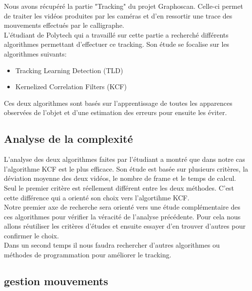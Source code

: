 \documentclass[12pt, letterpaper, twoside]{article}
\begin{document}
  

Nous avons r\'ecup\'er\'e la partie "Tracking" du projet Graphoscan. Celle-ci permet de traiter les vid\'eos produites par les cam\'eras et d'en ressortir une trace des mouvements effectu\'es par le calligraphe. \\

L'\'etudiant de Polytech qui a travaill\'e sur cette partie a recherch\'e diff\'erents algorithmes permettant d'effectuer ce tracking. Son \'etude se focalise sur les algorithmes suivants:

\begin{itemize}

\item Tracking Learning Detection (TLD)

\item Kernelized Correlation Filters (KCF)

\end{itemize}

Ces deux algorithmes sont bas\'es sur l'apprentissage de toutes les apparences observ\'ees de l'objet et d'une estimation des erreurs pour ensuite les \'eviter.
  
\subsection{Analyse de la complexité}

L'analyse des deux algorithmes faites par l'\'etudiant a montr\'e que dans notre cas l'algorithme KCF est le plus efficace. Son \'etude est bas\'ee sur plusieurs crit\`eres, la d\'eviation moyenne des deux vid\'eos, le nombre de frame et le temps de calcul. Seul le premier critère est r\'eellement diff\'erent entre les deux m\'ethodes. C'est cette diff\'erence qui a orient\'e son choix vers l'algortihme KCF. \\

Notre premier axe de recherche sera orient\'e vers une \'etude compl\'ementaire des ces algorithmes pour v\'erifier la v\'eracit\'e de l'analyse pr\'ec\'edente. Pour cela nous allons r\'eutiliser les crit\`eres d'\'etudes et ensuite essayer d'en trouver d'autres pour confirmer le choix. \\

Dans un second temps il nous faudra rechercher d'autres algorithmes ou m\'ethodes de programmation pour am\'eliorer le tracking.

\subsection{gestion mouvements}
\end{document}
